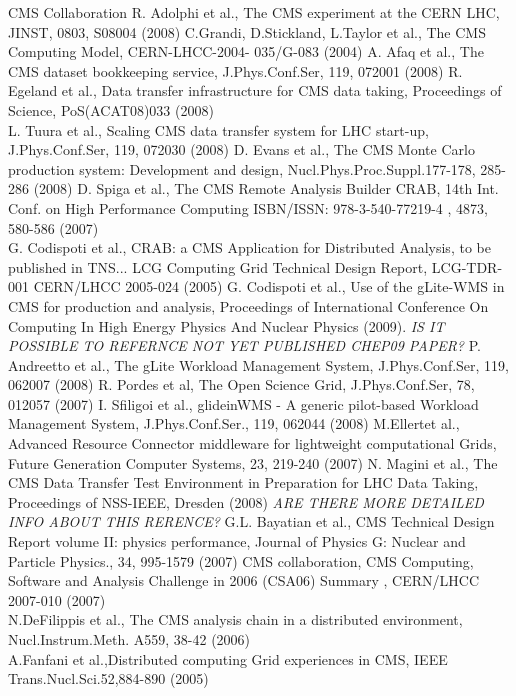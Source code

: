 \begin{thebibliography}{}
%
%
CMS Collaboration R. Adolphi et al., The CMS experiment at the CERN LHC, JINST, 0803, S08004 (2008)
%
C.Grandi, D.Stickland, L.Taylor et al., The CMS Computing Model, CERN-LHCC-2004-
035/G-083 (2004)
%
A. Afaq et al., The CMS dataset bookkeeping service, J.Phys.Conf.Ser, 119, 072001 (2008)
%
R. Egeland et al., Data transfer infrastructure for CMS data taking, Proceedings of Science, PoS(ACAT08)033 (2008)\\
L. Tuura et al., Scaling CMS data transfer system for LHC start-up, J.Phys.Conf.Ser, 119, 072030 (2008)
%
D. Evans et al., The CMS Monte Carlo production system: Development and design, Nucl.Phys.Proc.Suppl.177-178, 285-286 (2008)
%
D. Spiga et al., The CMS Remote Analysis Builder CRAB, 14th Int. Conf. on High Performance Computing ISBN/ISSN: 978-3-540-77219-4 , 4873, 580-586 (2007)\\
G. Codispoti et al., CRAB: a CMS Application for Distributed Analysis, to be published in TNS...
%
LCG Computing Grid Technical Design Report, LCG-TDR-001 CERN/LHCC 2005-024 (2005)
%
G. Codispoti et al., Use of the gLite-WMS in CMS for production and analysis, Proceedings of International Conference On Computing In High Energy Physics And Nuclear Physics (2009). \emph{IS IT POSSIBLE TO REFERNCE NOT YET PUBLISHED CHEP09 PAPER?}
%
 P. Andreetto et al., The gLite Workload Management System, J.Phys.Conf.Ser, 119, 062007 (2008)
%
 R. Pordes et al, The Open Science Grid, J.Phys.Conf.Ser, 78, 012057 (2007)
%
 I. Sfiligoi et al., glideinWMS - A generic pilot-based Workload Management System, J.Phys.Conf.Ser., 119, 062044 (2008)
%
 M.Ellertet al., Advanced Resource Connector middleware
  for lightweight computational Grids, Future Generation Computer Systems, 23, 219-240 (2007)
%
 N. Magini et al., The CMS Data Transfer Test Environment in Preparation for LHC Data Taking, Proceedings of NSS-IEEE, Dresden (2008)  \emph{ARE THERE MORE DETAILED INFO ABOUT THIS RERENCE?}
%
 G.L. Bayatian et al., CMS Technical Design Report volume II: physics performance, Journal of Physics G: Nuclear and Particle Physics., 34, 995-1579 (2007)
%
CMS collaboration,  CMS Computing, Software and Analysis Challenge in 2006 (CSA06) Summary , %
CERN/LHCC 2007-010 (2007) \\
N.DeFilippis et al., The CMS analysis chain in a distributed environment, Nucl.Instrum.Meth. A559, 38-42 (2006) \\
A.Fanfani et al.,Distributed computing Grid experiences in CMS, IEEE Trans.Nucl.Sci.52,884-890 (2005)
\end{thebibliography}



